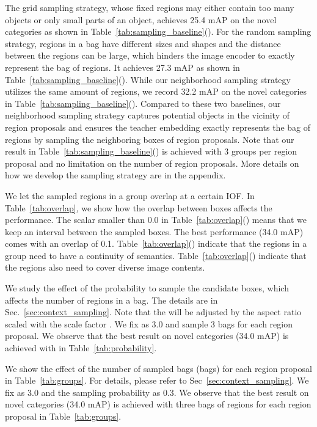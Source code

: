 The grid sampling strategy, whose fixed regions may either contain too many objects or only small parts of an object, achieves 25.4 mAP on the novel categories as shown in Table~\ref{tab:sampling_baseline}(). For the random sampling strategy, regions in a bag have different sizes and shapes and the distance between the regions can be large, which hinders the image encoder to exactly represent the bag of regions. It achieves 27.3 mAP as shown in Table~\ref{tab:sampling_baseline}(). While our neighborhood sampling strategy utilizes the same amount of regions, we record 32.2 mAP on the novel categories in Table~\ref{tab:sampling_baseline}(). Compared to these two baselines, our neighborhood sampling strategy captures potential objects in the vicinity of region proposals and ensures the teacher embedding exactly represents the bag of regions by sampling the neighboring boxes of region proposals. Note that our result in Table~\ref{tab:sampling_baseline}() is achieved with 3 groups per region proposal and no limitation on the number of region proposals. More details on how we develop the sampling strategy are in the appendix.


 We let the sampled regions in a group overlap at a certain IOF. In Table~\ref{tab:overlap}, we show how the overlap between boxes affects the performance. The scalar smaller than 0.0 in Table~\ref{tab:overlap}() means that we keep an interval between the sampled boxes. The best performance (34.0 mAP) comes with an overlap of 0.1. Table~\ref{tab:overlap}() indicate that the regions in a group need to have a continuity of semantics. Table~\ref{tab:overlap}() indicate that the regions also need to cover diverse image contents.


 We study the effect of the probability  to sample the candidate boxes, which affects the number of regions in a bag. The details are in Sec.~\ref{sec:context_sampling}. Note that the  will be adjusted by the aspect ratio scaled with the scale factor . We fix  as 3.0 and sample 3 bags for each region proposal. We observe that the best result on novel categories (34.0 mAP) is achieved with  in Table~\ref{tab:probability}.


 We show the effect of the number of sampled bags (bags) for each region proposal in Table~\ref{tab:groups}. For details, please refer to Sec~\ref{sec:context_sampling}. We fix  as 3.0 and the sampling probability  as 0.3. We observe that the best result on novel categories (34.0 mAP) is achieved with three bags of regions for each region proposal in Table~\ref{tab:groups}. 


